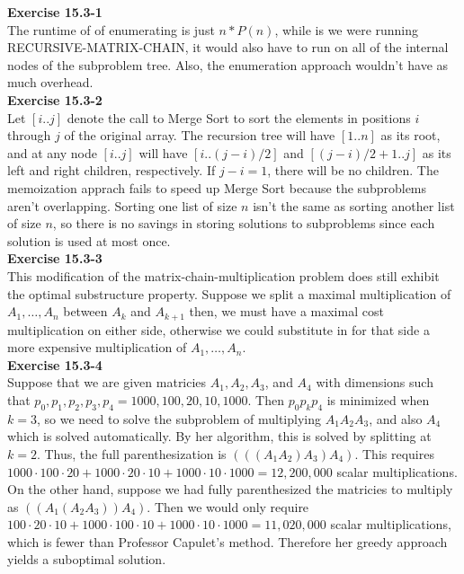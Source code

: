 \documentclass{article}
\begin{document}
\noindent\textbf{Exercise 15.3-1}\\

The runtime of of enumerating is just $n*P(n)$, while is we were running RECURSIVE-MATRIX-CHAIN, it would also have to run on all of the internal nodes of the subproblem tree. Also, the enumeration approach wouldn't have as much overhead.\\

\noindent\textbf{Exercise 15.3-2}\\

Let $[i..j]$ denote the call to Merge Sort to sort the elements in positions $i$ through $j$ of the original array. The recursion tree will have $[1..n]$ as its root, and at any node $[i..j]$ will have $[i..(j-i)/2]$ and $[(j-i)/2 + 1..j]$ as its left and right children, respectively.  If $j-i = 1$, there will be no children.  The memoization apprach fails to speed up Merge Sort because the subproblems aren't overlapping.  Sorting one list of size $n$ isn't the same as sorting another list of size $n$, so there is no savings in storing solutions to subproblems since each solution is used at most once.\\

\noindent\textbf{Exercise 15.3-3}\\

This modification of the matrix-chain-multiplication problem does still exhibit the optimal substructure property. Suppose we split a maximal multiplication of $A_1, \ldots,A_n$ between $A_k$ and $A_{k+1}$ then, we must have a maximal cost multiplication on either side, otherwise we could substitute in for that side a more expensive multiplication of $A_1,\ldots,A_n$.\\

\noindent\textbf{Exercise 15.3-4}\\

Suppose that we are given matricies $A_1, A_2, A_3$, and $A_4$ with dimensions such that $p_0,p_1,p_2,p_3,p_4 = 1000,100,20,10,1000$.  Then $p_0 p_k p_4$ is minimized when $k=3$, so we need to solve the subproblem of multiplying $A_1A_2A_3$, and also $A_4$ which is solved automatically.  By her algorithm, this is solved by splitting at $k=2$.  Thus, the full parenthesization is $(((A_1 A_2)A_3)A_4)$.  This requires $1000\cdot 100 \cdot 20 + 1000 \cdot 20 \cdot 10 + 1000 \cdot 10 \cdot 1000 = 12,200,000$ scalar multiplications. On the other hand, suppose we had fully parenthesized the matricies to multiply as $((A_1 (A_2A_3))A_4)$.  Then we would only require $100\cdot 20 \cdot 10 + 1000 \cdot 100 \cdot 10 + 1000 \cdot 10 \cdot 1000= 11,020,000$ scalar multiplications, which is fewer than Professor Capulet's method.  Therefore her greedy approach yields a suboptimal solution. \\
\end{document}
